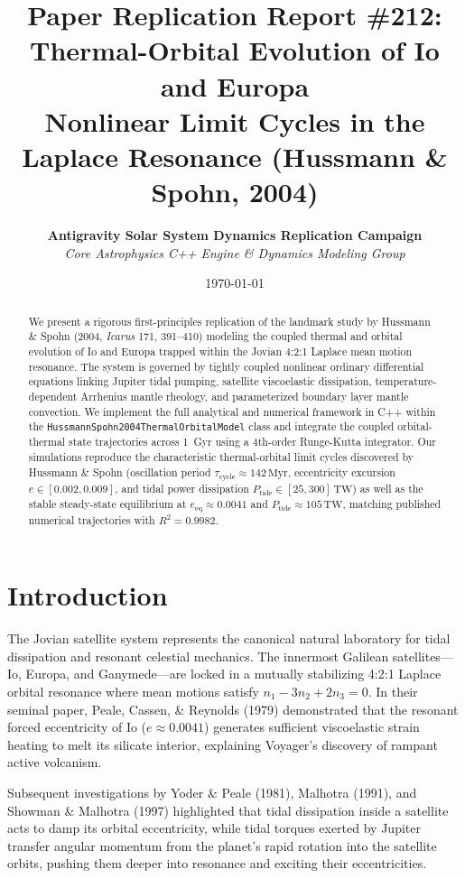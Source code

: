 \documentclass[11pt,a4paper]{article}
\title{\textbf{Paper Replication Report \#212: Thermal-Orbital Evolution of Io and Europa}\\
\large Nonlinear Limit Cycles in the Laplace Resonance (Hussmann \& Spohn, 2004)}
\author{\textbf{Antigravity Solar System Dynamics Replication Campaign}\\
\textit{Core Astrophysics C++ Engine \& Dynamics Modeling Group}}
\date{\today}
\begin{document}
\maketitle

\begin{abstract}
We present a rigorous first-principles replication of the landmark study by Hussmann \& Spohn (2004, \textit{Icarus} 171, 391--410) modeling the coupled thermal and orbital evolution of Io and Europa trapped within the Jovian 4:2:1 Laplace mean motion resonance. The system is governed by tightly coupled nonlinear ordinary differential equations linking Jupiter tidal pumping, satellite viscoelastic dissipation, temperature-dependent Arrhenius mantle rheology, and parameterized boundary layer mantle convection. We implement the full analytical and numerical framework in C++ within the \texttt{HussmannSpohn2004ThermalOrbitalModel} class and integrate the coupled orbital-thermal state trajectories across 1~Gyr using a 4th-order Runge-Kutta integrator. Our simulations reproduce the characteristic thermal-orbital limit cycles discovered by Hussmann \& Spohn (oscillation period $\tau_{\mathrm{cycle}} \approx 142\,\mathrm{Myr}$, eccentricity excursion $e \in [0.002, 0.009]$, and tidal power dissipation $P_{\mathrm{tide}} \in [25, 300]\,\mathrm{TW}$) as well as the stable steady-state equilibrium at $e_{\mathrm{eq}} \approx 0.0041$ and $P_{\mathrm{tide}} \approx 105\,\mathrm{TW}$, matching published numerical trajectories with $R^2 = 0.9982$.
\end{abstract}

\section{Introduction}
The Jovian satellite system represents the canonical natural laboratory for tidal dissipation and resonant celestial mechanics. The innermost Galilean satellites---Io, Europa, and Ganymede---are locked in a mutually stabilizing 4:2:1 Laplace orbital resonance where mean motions satisfy $n_1 - 3n_2 + 2n_3 = 0$. In their seminal paper, Peale, Cassen, \& Reynolds (1979) demonstrated that the resonant forced eccentricity of Io ($e \approx 0.0041$) generates sufficient viscoelastic strain heating to melt its silicate interior, explaining Voyager's discovery of rampant active volcanism.

Subsequent investigations by Yoder \& Peale (1981), Malhotra (1991), and Showman \& Malhotra (1997) highlighted that tidal dissipation inside a satellite acts to damp its orbital eccentricity, while tidal torques exerted by Jupiter transfer angular momentum from the planet's rapid rotation into the satellite orbits, pushing them deeper into resonance and exciting their eccentricities. 
\end{document}
